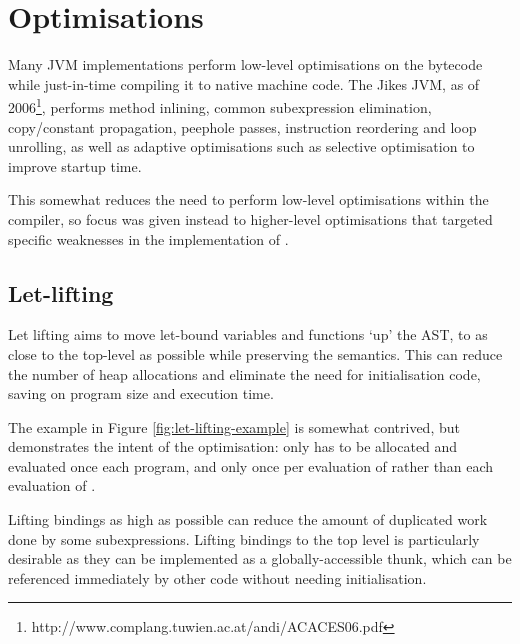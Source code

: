 \documentclass[dissertation.tex]{subfiles}
\begin{document}
\section{Optimisations}
{
    Many JVM implementations perform low-level optimisations on the bytecode while just-in-time compiling it to native machine code. The Jikes JVM, as of 2006\footnote{http://www.complang.tuwien.ac.at/andi/ACACES06.pdf}, performs method inlining, common subexpression elimination, copy/constant propagation, peephole passes, instruction reordering and loop unrolling, as well as adaptive optimisations such as selective optimisation to improve startup time.

    This somewhat reduces the need to perform low-level optimisations within the compiler, so focus was given instead to higher-level optimisations that targeted specific weaknesses in the implementation of \compilername.

    \subsection{Let-lifting}
    {
        Let lifting aims to move let-bound variables and functions `up' the AST, to as close to the top-level as possible while preserving the semantics. This can reduce the number of heap allocations and eliminate the need for initialisation code, saving on program size and execution time.

        The example in Figure \ref{fig:let-lifting-example} is somewhat contrived, but demonstrates the intent of the optimisation:  only has to be allocated and evaluated once each program, and  only once per evaluation of  rather than each evaluation of .

        Lifting bindings as high as possible can reduce the amount of duplicated work done by some subexpressions. Lifting bindings to the top level is particularly desirable as they can be implemented as a globally-accessible thunk, which can be referenced immediately by other code without needing initialisation.

}}
\end{document}
